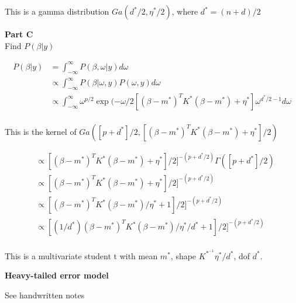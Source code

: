 \documentclass[12pt]{amsart}
\begin{document}
This is a gamma distribution $Ga(d^*/2, \eta^*/2)$, where $d^*=(n+d)/2$

\bigskip
\bigskip

\textbf{Part C}\\

Find $P(\beta|y)$

\begin{align*}
    P(\beta|y) &= \int_{-\infty}^{\infty}P(\beta, \omega|y)d\omega \\
    & \propto \int_{-\infty}^{\infty} P(\beta|\omega, y)P(\omega, y) d\omega\\
    & \propto \int_{-\infty}^{\infty} \omega^{p/2}\exp{(-\omega/2[
   (\beta-m^*)^TK^*(\beta-m^*) + \eta^*]}  \omega^{d^*/2-1}    d\omega\\
\end{align*}

This is the kernel of $Ga([p+d^*]/2,   [(\beta-m^*)^TK^*(\beta-m^*) + \eta^*]/2)$

\begin{align*}
    & \propto [(\beta-m^*)^TK^*(\beta-m^*) + \eta^*]/2]^{-(p+d^*/2)} \Gamma([p+d^*]/2)\\
    & \propto [(\beta-m^*)^TK^*(\beta-m^*) + \eta^*]/2]^{-(p+d^*/2)}\\
    & \propto [(\beta-m^*)^TK^*(\beta-m^*)/\eta^* + 1]/2]^{-(p+d^*/2)}\\
     & \propto [(1/d^*)(\beta-m^*)^TK^*(\beta-m^*)/\eta^*/d^* + 1]/2]^{-(p+d^*/2)}
\end{align*}\\

This is a multivariate student t with mean $m^*$, shape $ K^*^{-1}\eta^*/d^*$, dof $d^*$.


\bigskip
\bigskip

{\bf \large Heavy-tailed error model} 
\bigskip

See handwritten notes
\end{document}
